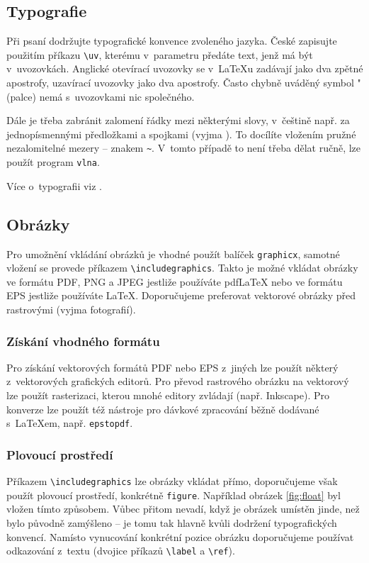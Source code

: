 \documentclass[thesis=B,czech]{FITthesis}[2011/06/14]
\begin{document}
 \subsection{Typografie}
 
 Při psaní dodržujte typografické konvence zvoleného jazyka. České  zapisujte použitím příkazu \verb|\uv|, kterému v~parametru předáte text, jenž má být v~uvozovkách. Anglické otevírací uvozovky se v~\LaTeX{}u zadávají jako dva zpětné apostrofy, uzavírací uvozovky jako dva apostrofy. Často chybně uváděný symbol "{} (palce) nemá s~uvozovkami nic společného.
 
 Dále je třeba zabránit zalomení řádky mezi některými slovy, v~češtině např. za jednopísmennými předložkami a spojkami (vyjma ). To docílíte vložením pružné nezalomitelné mezery -- znakem \texttt{\textasciitilde}. V~tomto případě to není třeba dělat ručně, lze použít program \verb|vlna|.
 
 Více o~typografii viz \cite{kobltypo}.
 
 \subsection{Obrázky}
 
 Pro umožnění vkládání obrázků je vhodné použít balíček \verb|graphicx|, samotné vložení se provede příkazem \verb|\includegraphics|. Takto je možné vkládat obrázky ve formátu PDF, PNG a JPEG jestliže používáte pdf\LaTeX{} nebo ve formátu EPS jestliže používáte \LaTeX{}. Doporučujeme preferovat vektorové obrázky před rastrovými (vyjma fotografií).
 
 \subsubsection{Získání vhodného formátu}
 
 Pro získání vektorových formátů PDF nebo EPS z~jiných lze použít některý z~vektorových grafických editorů. Pro převod rastrového obrázku na vektorový lze použít rasterizaci, kterou mnohé editory zvládají (např. Inkscape). Pro konverze lze použít též nástroje pro dávkové zpracování běžně dodávané s~\LaTeX{}em, např. \verb|epstopdf|.
 
 \subsubsection{Plovoucí prostředí}
 
 Příkazem \verb|\includegraphics| lze obrázky vkládat přímo, doporučujeme však použít plovoucí prostředí, konkrétně \verb|figure|. Například obrázek \ref{fig:float} byl vložen tímto způsobem. Vůbec přitom nevadí, když je obrázek umístěn jinde, než bylo původně zamýšleno -- je tomu tak hlavně kvůli dodržení typografických konvencí. Namísto vynucování konkrétní pozice obrázku doporučujeme používat odkazování z~textu (dvojice příkazů \verb|\label| a \verb|\ref|).
 
\end{document}
